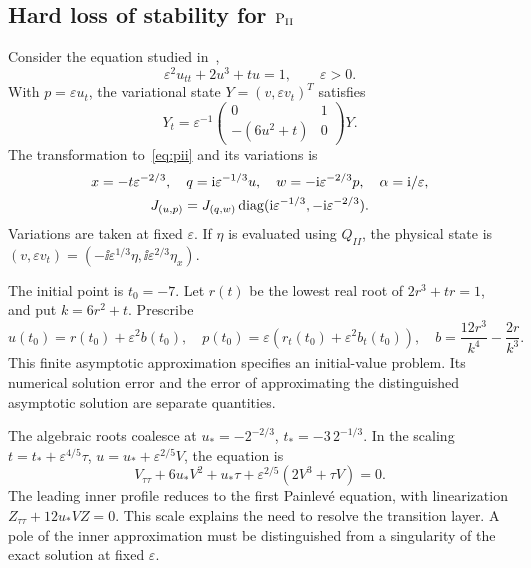 \subsection{Hard loss of stability for \texorpdfstring{$\mathrm{P}_{\mathrm{II}}$}{PII}}
Consider the equation studied in~\cite{Kiselev01},
\begin{equation}\label{eq:rigid}
 \varepsilon^2u_{tt}+2u^3+tu=1,\qquad\varepsilon>0.
\end{equation}
With $p=\varepsilon u_t$, the variational state
$Y=(v,\varepsilon v_t)^T$ satisfies
\begin{equation*}
 Y_t=\varepsilon^{-1}
 \begin{pmatrix}0&1\\-(6u^2+t)&0\end{pmatrix}Y.
\end{equation*}
The transformation to~\eqref{eq:pii} and its variations is
\begin{equation*}
 \begin{gathered}
 x=-t\varepsilon^{-2/3},\quad q=\mathrm{i}\varepsilon^{-1/3}u,
 \quad w=-\mathrm{i}\varepsilon^{-2/3}p,\quad\alpha=\mathrm{i}/\varepsilon,\\
 J_{(u,p)}=J_{(q,w)}\operatorname{diag}(\mathrm{i}\varepsilon^{-1/3},-\mathrm{i}\varepsilon^{-2/3}).
 \end{gathered}
\end{equation*}
Variations are taken at fixed $\varepsilon$.
If $\eta$ is evaluated using $Q_{II}$, the physical state is
$(v,\varepsilon v_t)=(-\ii\varepsilon^{1/3}\eta,
\ii\varepsilon^{2/3}\eta_x)$.

The initial point is $t_0=-7$. Let $r(t)$ be the lowest real root of
$2r^3+tr=1$, and put $k=6r^2+t$. Prescribe
\begin{equation*}
 u(t_0)=r(t_0)+\varepsilon^2b(t_0),\quad
 p(t_0)=\varepsilon(r_t(t_0)+\varepsilon^2b_t(t_0)),\quad
 b=\frac{12r^3}{k^4}-\frac{2r}{k^3}.
\end{equation*}
This finite asymptotic approximation specifies an initial-value problem.
Its numerical solution error and the error of approximating the
distinguished asymptotic solution are separate quantities.

The algebraic roots coalesce at $u_*=-2^{-2/3}$,
$t_*=-3\,2^{-1/3}$. In the scaling
$t=t_*+\varepsilon^{4/5}\tau$, $u=u_*+\varepsilon^{2/5}V$, the equation is
\begin{equation*}
 V_{\tau\tau}+6u_*V^2+u_*\tau
 +\varepsilon^{2/5}(2V^3+\tau V)=0.
\end{equation*}
The leading inner profile reduces to the first Painlev\'e equation,
with linearization $Z_{\tau\tau}+12u_*VZ=0$.
This scale explains the need to resolve the transition layer.
A pole of the inner approximation must be distinguished from a
singularity of the exact solution at fixed $\varepsilon$.

